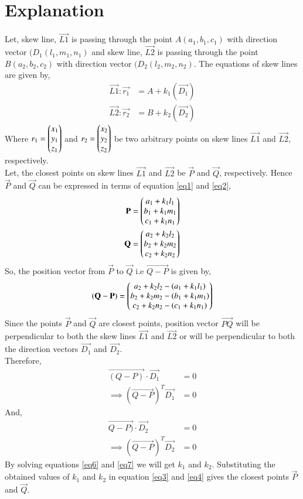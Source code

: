 \documentclass[journal,12pt,twocolumn]{IEEEtran}
\begin{document}
\section{Explanation}
Let, skew line, $\vec{L1}$ is passing through the point $A(a_1,b_1,c_1)$ with direction vector $(D_1(l_1,m_1,n_1)$ and skew line, $\vec{L2}$ is passing through the point $B(a_2,b_2,c_2)$  with direction vector $(D_2(l_2,m_2,n_2)$. The equations of skew lines are given by,
\begin{align}
\vec{L1}: \vec{r_1}&=A+k_1(\vec{D_1})\label{eq1}\\
\vec{L2}: \vec{r_2}&=B+k_2(\vec{D_2})\label{eq2}
\end{align}
Where $r_1=\begin{pmatrix}x_1\\y_1\\z_1\end{pmatrix}$ and $r_2=\begin{pmatrix}x_2\\ y_2\\z_2\end{pmatrix}$ be two arbitrary points on skew lines $\vec{L1}$ and $\vec{L2}$, respectively. \\
Let, the closest points on skew lines $\vec{L1}$ and $\vec{L2}$ be $\vec{P}$ and $\vec{Q}$, respectively. Hence $\vec{P}$ and $\vec{Q}$ can be expressed in terms of equation \eqref{eq1} and \eqref{eq2},
\begin{align}
\mathbf{P}=\begin{pmatrix}a_1+k_1l_1\\b_1+k_1m_1\\c_1+k_1n_1\end{pmatrix}\label{eq3}\\
\mathbf{Q}=\begin{pmatrix}a_2+k_2l_2\\b_2+k_2m_2\\c_2+k_2n_2\end{pmatrix}\label{eq4}
\end{align}
So, the position vector from $\vec{P}$ to $\vec{Q}$ i.e $\vec{Q-P}$ is given by, 
\begin{align}
\mathbf{(Q-P)}=\begin{pmatrix}a_2+k_2l_2-(a_1+k_1l_1)\\b_2+k_2m_2-(b_1+k_1m_1)\\
c_2+k_2n_2-(c_1+k_1n_1)\end{pmatrix}\label{eq5}
\end{align}
Since the points $\vec{P}$ and $\vec{Q}$ are closest points, position vector $\vec{PQ}$ will be perpendicular to both the skew lines $\vec{L1}$ and $\vec{L2}$ or will be perpendicular to both the direction vectors $\vec{D_1}$ and $\vec{D_2}$.\\ 
Therefore,
\begin{align}
\vec{(Q-P)}\cdot\vec{D_1}&=0\\
\implies(\vec{Q-P})^T\vec{D_1}&=0\label{eq6}
\end{align}
And,
\begin{align}
\vec{Q-P)}\cdot\vec{D_2}&=0\\
\implies(\vec{Q-P})^T\vec{D_2}&=0\label{eq7}
\end{align}
By solving equations \ref{eq6} and \ref{eq7} we will get $k_1$ and $k_2$. Substituting the obtained values of $k_1$ and $k_2$ in equation \ref{eq3} and \ref{eq4} gives the closest points $\vec{P}$ and $\vec{Q}$.
\end{document}
